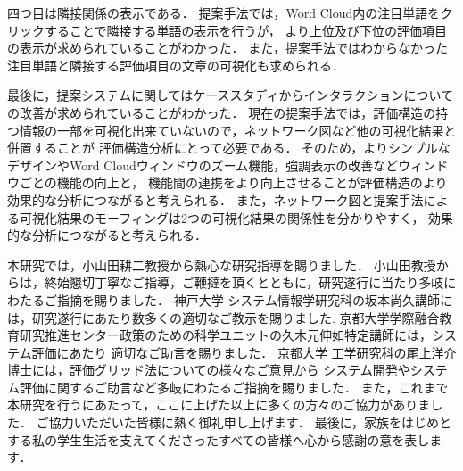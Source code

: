 \documentclass[syuuron]{kuee}
\begin{document}
		四つ目は隣接関係の表示である．
		提案手法では，Word Cloud内の注目単語をクリックすることで隣接する単語の表示を行うが，
		より上位及び下位の評価項目の表示が求められていることがわかった．
		また，提案手法ではわからなかった注目単語と隣接する評価項目の文章の可視化も求められる．
		
		最後に，提案システムに関してはケーススタディからインタラクションについての改善が求められていることがわかった．
		現在の提案手法では，評価構造の持つ情報の一部を可視化出来ていないので，ネットワーク図など他の可視化結果と併置することが
		評価構造分析にとって必要である．
		そのため，よりシンプルなデザインやWord Cloudウィンドウのズーム機能，強調表示の改善などウィンドウごとの機能の向上と，
		機能間の連携をより向上させることが評価構造のより効果的な分析につながると考えられる．
		また，ネットワーク図と提案手法による可視化結果のモーフィングは2つの可視化結果の関係性を分かりやすく，
		効果的な分析につながると考えられる．

\begin{acknowledgements}
	本研究では，小山田耕二教授から熱心な研究指導を賜りました．
	小山田教授からは，終始懇切丁寧なご指導，ご鞭撻を頂くとともに，研究遂行に当たり多岐にわたるご指摘を賜りました．
	神戸大学 システム情報学研究科の坂本尚久講師には，研究遂行にあたり数多くの適切なご教示を賜りました.
	京都大学学際融合教育研究推進センター政策のための科学ユニットの久木元伸如特定講師には，システム評価にあたり
	適切なご助言を賜りました．
	京都大学 工学研究科の尾上洋介博士には，評価グリッド法についての様々なご意見から
	システム開発やシステム評価に関するご助言など多岐にわたるご指摘を賜りました．
	また，これまで本研究を行うにあたって，ここに上げた以上に多くの方々のご協力がありました．
	ご協力いただいた皆様に熱く御礼申し上げます．
	最後に，家族をはじめとする私の学生生活を支えてくださったすべての皆様へ心から感謝の意を表します．
\end{acknowledgements}
\end{document}
